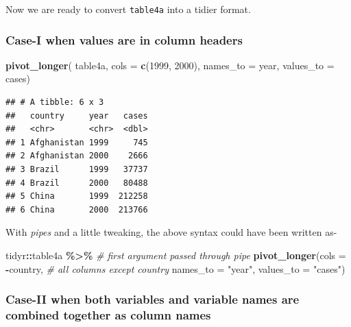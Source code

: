 \documentclass[
]{book}
\newenvironment{Shaded}{\begin{snugshade}}{\end{snugshade}}
\newcommand{\AttributeTok}[1]{\textcolor[rgb]{0.13,0.29,0.53}{#1}}
\newcommand{\CommentTok}[1]{\textcolor[rgb]{0.56,0.35,0.01}{\textit{#1}}}
\newcommand{\FunctionTok}[1]{\textcolor[rgb]{0.13,0.29,0.53}{\textbf{#1}}}
\newcommand{\NormalTok}[1]{#1}
\newcommand{\SpecialCharTok}[1]{\textcolor[rgb]{0.81,0.36,0.00}{\textbf{#1}}}
\newcommand{\StringTok}[1]{\textcolor[rgb]{0.31,0.60,0.02}{#1}}
\begin{document}
Now we are ready to convert \texttt{table4a} into a tidier format.

\hypertarget{case-i-when-values-are-in-column-headers}{%
\subsubsection*{Case-I when values are in column headers}\label{case-i-when-values-are-in-column-headers}}

\begin{Shaded}
\begin{Highlighting}[]
\FunctionTok{pivot\_longer}\NormalTok{(}
\NormalTok{  table4a, }
  \AttributeTok{cols =} \FunctionTok{c}\NormalTok{(}\StringTok{\textquotesingle{}1999\textquotesingle{}}\NormalTok{, }\StringTok{\textquotesingle{}2000\textquotesingle{}}\NormalTok{), }
  \AttributeTok{names\_to =} \StringTok{\textquotesingle{}year\textquotesingle{}}\NormalTok{, }
  \AttributeTok{values\_to =} \StringTok{\textquotesingle{}cases\textquotesingle{}}\NormalTok{)}
\end{Highlighting}
\end{Shaded}

\begin{verbatim}
## # A tibble: 6 x 3
##   country     year   cases
##   <chr>       <chr>  <dbl>
## 1 Afghanistan 1999     745
## 2 Afghanistan 2000    2666
## 3 Brazil      1999   37737
## 4 Brazil      2000   80488
## 5 China       1999  212258
## 6 China       2000  213766
\end{verbatim}

With \emph{pipes} and a little tweaking, the above syntax could have been written as-

\begin{Shaded}
\begin{Highlighting}[]
\NormalTok{tidyr}\SpecialCharTok{::}\NormalTok{table4a }\SpecialCharTok{\%\textgreater{}\%}                         \CommentTok{\# first argument passed through pipe }
  \FunctionTok{pivot\_longer}\NormalTok{(}\AttributeTok{cols =} \SpecialCharTok{{-}}\NormalTok{country,     }\CommentTok{\# all columns except country}
               \AttributeTok{names\_to =} \StringTok{"year"}\NormalTok{,}
               \AttributeTok{values\_to =} \StringTok{"cases"}\NormalTok{)}
\end{Highlighting}
\end{Shaded}

\hypertarget{case-ii-when-both-variables-and-variable-names-are-combined-together-as-column-names}{%
\subsubsection*{Case-II when both variables and variable names are combined together as column names}\label{case-ii-when-both-variables-and-variable-names-are-combined-together-as-column-names}}
\end{document}
